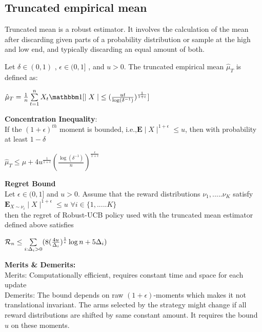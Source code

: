 \documentclass[11pt]{article}
\begin{document}
\subsection{Truncated empirical mean}

Truncated mean is a robust estimator. It involves the calculation of the mean after discarding given parts of a probability distribution or sample at the high and low end, and typically discarding an equal amount of both.


Let $\delta \in (0,1)$ , $\epsilon \in (0,1]$ , and $u > 0$. The truncated empirical mean $\hat\mu_{T}$  is defined as:


$\hat\mu_{T} = \frac{1}{n}\sum\limits^{n}_{t = 1}X_{t}\ind{[{\mid X \mid} \leq (\frac{ut}{\log(\delta^{-1 })})^{\frac{1}{1+\epsilon}}]}$

\begin{flushleft}
\textbf{Concentration Inequality}:\\
If the $(1+\epsilon)^{th}$ moment is bounded, i.e.,$\mathbf{E} \mid X \mid^{1+\epsilon} \leq u$, then with probability at least $1- \delta $
\end{flushleft}

$\hat\mu_{T} \leq \mu + 4u^{\frac{1}{1+\epsilon}}(\frac{\log(\delta^{-1})}{n})^{\frac{\epsilon}{1+\epsilon}}$\\
\begin{flushleft}
\textbf{Regret Bound}\\
Let $\epsilon \in (0,1]$ and $u > 0$. Assume that the reward distributions $\nu_{1},.....\nu_{K}$ satisfy
$\mathbf{E}_{X\sim\nu_{i}} \mid X \mid ^{1+\epsilon} \leq u $ $\forall i \in \{1,.....K\}$\\

then the regret of Robust-UCB policy used with the truncated mean estimator defined above satisfies\\
\end{flushleft}

$\mathcal{R}_{n} \leq \sum\limits_{i: \Delta_{i} >0} (8(\frac{4u}{\Delta_{i}})^{\frac{1}{\epsilon}}\log n + 5\Delta_{i})$\\
\begin{flushleft}
\textbf{Merits \& Demerits:\\}
Merits: Computationally efficient, requires constant time and space for each update\\
Demerits: The bound depends on raw $(1+\epsilon)$-moments which makes it not translational invariant. The arms selected by the strategy might change if all reward distributions are shifted by same constant amount. It requires the bound $u$ on these moments. 
\end{flushleft}
\end{document}
